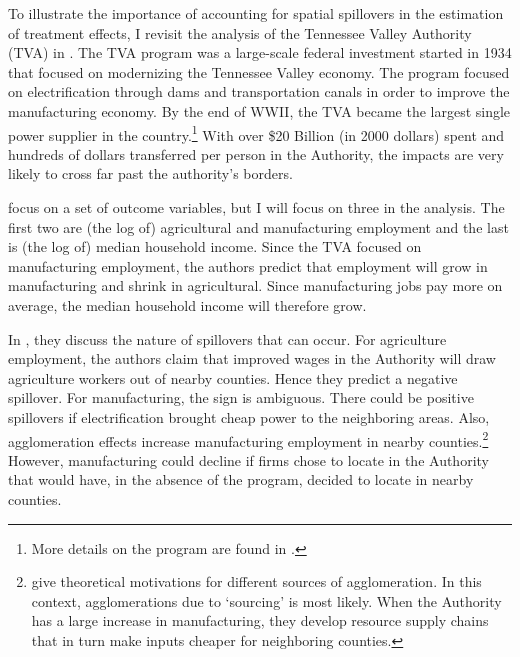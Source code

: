 \documentclass[11pt]{article}
\begin{document}
To illustrate the importance of accounting for spatial spillovers in the estimation of treatment effects, I revisit the analysis of the Tennessee Valley Authority (TVA) in \citet{Kline_Moretti_2014}. The TVA program was a large-scale federal investment started in 1934 that focused on modernizing the Tennessee Valley economy. The program focused on electrification through dams and transportation canals in order to improve the manufacturing economy. By the end of WWII, the TVA became the largest single power supplier in the country.\footnote{More details on the program are found in \citet{Kline_Moretti_2014}.} With over \$20 Billion (in 2000 dollars) spent and hundreds of dollars transferred per person in the Authority, the impacts are very likely to cross far past the authority's borders. 

\citet{Kline_Moretti_2014} focus on a set of outcome variables, but I will focus on three in the analysis. The first two are (the log of) agricultural and manufacturing employment and the last is (the log of) median household income. Since the TVA focused on manufacturing employment, the authors predict that employment will grow in manufacturing and shrink in agricultural. Since manufacturing jobs pay more on average, the median household income will therefore grow. 

In \citet{Kline_Moretti_2014}, they discuss the nature of spillovers that can occur. For agriculture employment, the authors claim that improved wages in the Authority will draw agriculture workers out of nearby counties. Hence they predict a negative spillover. For manufacturing, the sign is ambiguous. There could be positive spillovers if electrification brought cheap power to the neighboring areas. Also, agglomeration effects increase manufacturing employment in nearby counties.\footnote{\citet{Duranton_Puga_2003} give theoretical motivations for different sources of agglomeration. In this context, agglomerations due to `sourcing' is most likely. When the Authority has a large increase in manufacturing, they develop resource supply chains that in turn make inputs cheaper for neighboring counties.} However, manufacturing could decline if firms chose to locate in the Authority that would have, in the absence of the program, decided to locate in nearby counties. 
\end{document}
